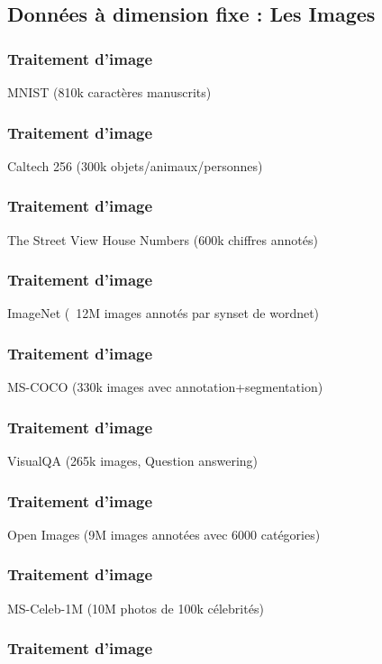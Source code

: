 \subsection{Données à dimension fixe : Les Images}

\begin{frame}
  \frametitle{Traitement d'image}
  MNIST (810k caractères manuscrits)
\end{frame}

\begin{frame}
  \frametitle{Traitement d'image}
  Caltech 256 (300k objets/animaux/personnes)
\end{frame}

\begin{frame}
  \frametitle{Traitement d'image}
  The Street View House Numbers (600k chiffres annotés)
\end{frame}

\begin{frame}
  \frametitle{Traitement d'image}
  ImageNet (~12M images annotés par synset de wordnet)
\end{frame}

\begin{frame}
  \frametitle{Traitement d'image}
  MS-COCO (330k images avec annotation+segmentation)
\end{frame}

\begin{frame}
  \frametitle{Traitement d'image}
  VisualQA (265k images, Question answering)
\end{frame}

\begin{frame}
  \frametitle{Traitement d'image}
  Open Images (9M images annotées avec 6000 catégories)
\end{frame}

\begin{frame}
  \frametitle{Traitement d'image}
  MS-Celeb-1M (10M photos de 100k célebrités)
\end{frame}

\begin{frame}
  \frametitle{Traitement d'image}
  \begin{center}
  \end{center}
\end{frame}

